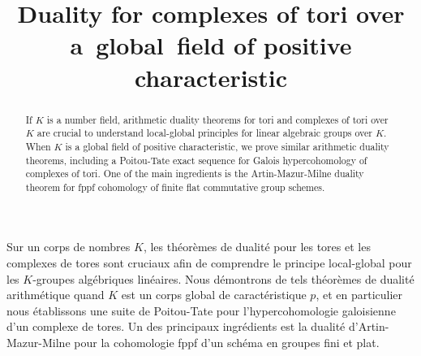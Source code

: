 \documentclass[JEP,XML,SOM,Unicode, NoEqCountersInSection]{cedram}
\theoremstyle{plain}
\theoremstyle{definition}
\begin{document}
\frontmatter

\title{Duality for complexes of tori over a~global~field of positive
characteristic}

\author[\initial{C.} \lastname{Demarche}]{ }
\address{Université de Paris, Sorbonne Université, CNRS, Institut de Mathématiques de Jussieu-Paris Rive Gauche\\
75013 Paris, France\\
and Département de mathématiques et applications, École normale supérieure, CNRS, PSL Research University\\
45 rue d'Ulm, 75005 Paris, France}

\author[\initial{D.} \lastname{Harari}]{ }
\address{Université Paris-Saclay, C.N.R.S.,
Laboratoire de Mathématiques d'Orsay\\
91405 Orsay, France}

\begin{abstract}
If $K$ is a number field, arithmetic duality theorems for tori and complexes of tori over $K$ are crucial to understand local-global principles for linear algebraic groups over $K$. When $K$ is a global field of positive characteristic, we prove similar arithmetic duality theorems, including a Poitou-Tate exact sequence for Galois hypercohomology of complexes of tori. One of the main ingredients is the Artin-Mazur-Milne duality theorem for fppf cohomology of finite flat commutative group schemes.
\end{abstract}





\begin{altabstract}
Sur un corps de nombres $K$, les théorèmes de dualité pour les tores et les complexes de tores sont cruciaux afin de comprendre le principe local-global pour les $K$-groupes algébriques linéaires. Nous démontrons de tels théorèmes de dualité arithmétique quand $K$ est un corps global de caractéristique $p$, et en particulier nous établissons une suite de Poitou-Tate pour l'hypercohomologie galoisienne d'un complexe de tores. Un des principaux ingrédients est la dualité d'Artin-Mazur-Milne pour la cohomologie fppf d'un schéma en groupes fini et plat.
\end{altabstract}
\end{document}

